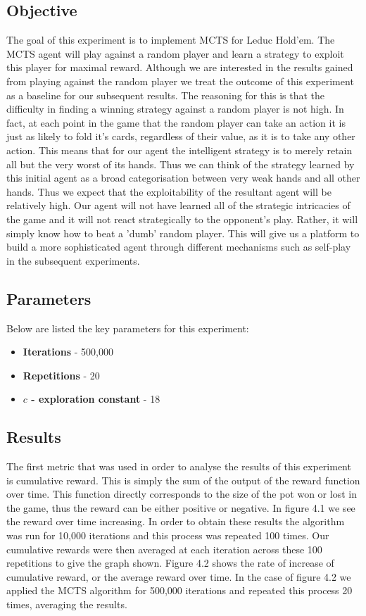 \subsection{Objective}\label{subsec:objective1}
The goal of this experiment is to implement MCTS for Leduc Hold'em.
The MCTS agent will play against a random player and learn a strategy to exploit this player for
maximal reward.
Although we are interested in the results gained from playing against the random player we treat the
outcome of this experiment as a baseline for our subsequent results.
The reasoning for this is that the difficulty in finding a winning strategy against a random player
is not high.
In fact, at each point in the game that the random player can take an action it is
just as likely to fold it's cards, regardless of their value, as it is to take any other action.
This means that for our agent the intelligent strategy is to merely retain all but the
very worst of its hands.
Thus we can think of the strategy learned by this initial agent as a broad
categorisation between very weak hands and all other hands.
Thus we expect that the exploitability of the resultant agent will be relatively high.
Our agent will not have learned all of the strategic intricacies of the game
and it will not react strategically to the opponent's play.
Rather, it will simply know how to beat a 'dumb' random player.
This will give us a platform to build a more sophisticated agent through different mechanisms such as
self-play in the subsequent experiments.

\subsection{Parameters}\label{subsec:algAndCoding1}
Below are listed the key parameters for this experiment:
\begin{itemize}
    \item \textbf{Iterations} - 500,000
    \item \textbf{Repetitions} - 20
    \item \textbf{$c$ - exploration constant} - 18
\end{itemize}

\subsection{Results}\label{subsec:results1}
The first metric that was used in order to analyse the results of this experiment is cumulative reward.
This is simply the sum of the output of the reward function over time.
This function directly corresponds to the size of the pot won or lost in the game,
thus the reward can be either positive or negative.
In figure 4.1 we see the reward over time increasing.
In order to obtain these results the algorithm was run for 10,000 iterations and this process was repeated 100 times.
Our cumulative rewards were then averaged at each iteration across these 100 repetitions to give the graph shown.
Figure 4.2 shows the rate of increase of cumulative reward, or the average reward over time.
In the case of figure 4.2 we applied the MCTS algorithm for 500,000 iterations and
repeated this process 20 times, averaging the results.

